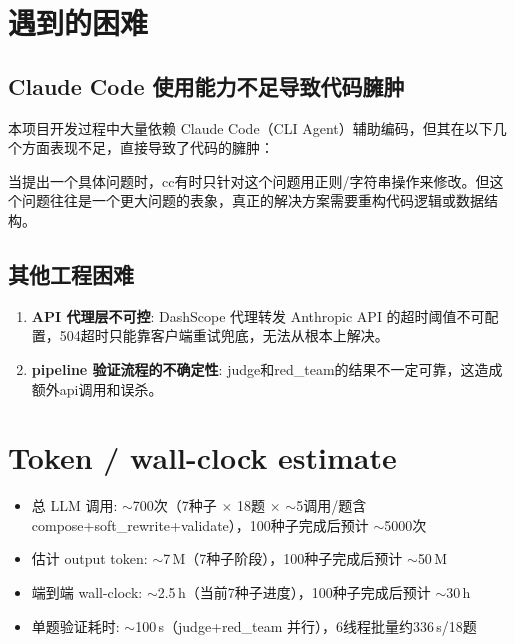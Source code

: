 \documentclass[11pt,a4paper]{article}
\begin{document}
\section{遇到的困难}

\subsection{Claude Code 使用能力不足导致代码臃肿}

本项目开发过程中大量依赖 Claude Code（CLI Agent）辅助编码，但其在以下几个方面表现不足，直接导致了代码的臃肿：

当提出一个具体问题时，cc有时只针对这个问题用正则/字符串操作来修改。但这个问题往往是一个更大问题的表象，真正的解决方案需要重构代码逻辑或数据结构。

\subsection{其他工程困难}

\begin{enumerate}
  \item \textbf{API 代理层不可控}: DashScope 代理转发 Anthropic API 的超时阈值不可配置，504超时只能靠客户端重试兜底，无法从根本上解决。

  \item \textbf{pipeline 验证流程的不确定性}: judge和red\_team的结果不一定可靠，这造成额外api调用和误杀。
\end{enumerate}

\section{Token / wall-clock estimate}

\begin{itemize}[nosep]
  \item 总 LLM 调用: $\sim$700次（7种子 $\times$ 18题 $\times$ $\sim$5调用/题含 compose+soft\_rewrite+validate），100种子完成后预计 $\sim$5000次
  \item 估计 output token: $\sim$7\,M（7种子阶段），100种子完成后预计 $\sim$50\,M
  \item 端到端 wall-clock: $\sim$2.5\,h（当前7种子进度），100种子完成后预计 $\sim$30\,h
  \item 单题验证耗时: $\sim$100\,s（judge+red\_team 并行），6线程批量约336\,s/18题
\end{itemize}
\end{document}
